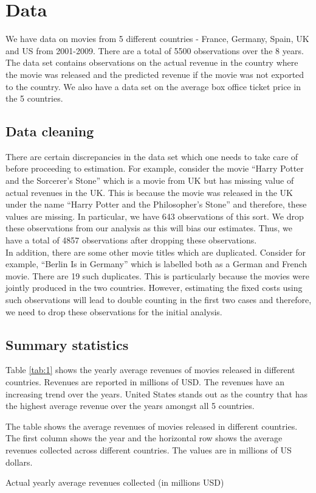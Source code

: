 \documentclass[11pt, letterpaper]{article} \usepackage{amsmath}
\newcommand{\floatintro}[1]{
  
  \vspace*{0.1in}
  
  {\footnotesize

    #1
    
  }
  
  \vspace*{0.1in} } \newcommand{\Hline}{\noindent\rule{18cm}{0.5pt}}
\begin{document}
\section{Data}
We have data on movies from 5 different countries - France, Germany,
Spain, UK and US from 2001-2009. There are a total of 5500
observations over the 8 years. The data set contains observations on
the actual revenue in the country where the movie was released and the
predicted revenue if the movie was not exported to the country. We
also have a data set on the average box office ticket price in the 5
countries.
\subsection{Data cleaning}
There are certain discrepancies in the data set which one needs to
take care of before proceeding to estimation. For example, consider
the movie ``Harry Potter and the Sorcerer's Stone'' which is a movie
from UK but has missing value of actual revenues in the UK. This is
because the movie was released in the UK under the name ``Harry Potter
and the Philosopher's Stone'' and therefore, these values are
missing. In particular, we have 643 observations of this sort. We drop
these observations from our analysis as this will bias our
estimates. Thus, we have a total of 4857 observations after
dropping these observations. \\
In addition, there are some other movie titles which are
duplicated. Consider for example, ``Berlin Is in Germany'' which is
labelled both as a German and French movie. There are 19 such
duplicates. This is particularly because the movies were jointly
produced in the two countries. However, estimating the fixed costs
using such observations will lead to double counting in the first two
cases and therefore, we need to drop these observations for the
initial analysis.
\subsection{Summary statistics}
Table \ref{tab:1} shows the yearly average revenues of movies released
in different countries. Revenues are reported in millions of USD. The
revenues have an increasing trend over the years. United States stands
out as the country that has the highest average revenue over the years
amongst all 5 countries.
\begin{table}[htbp!]
  \floatintro{The table shows the average revenues of movies released
    in different countries. The first column shows the year and the
    horizontal row shows the average revenues collected across
    different countries. The values are in millions of US dollars.}
  \centering
  
  \caption{Actual yearly average revenues collected (in millions USD)}
  \label{tab:1}
\end{table}
\end{document}
